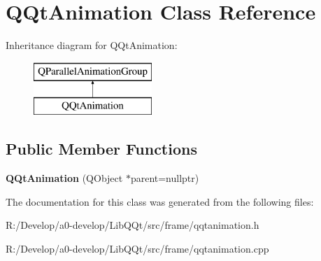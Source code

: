 \hypertarget{class_q_qt_animation}{}\section{Q\+Qt\+Animation Class Reference}
\label{class_q_qt_animation}
Inheritance diagram for Q\+Qt\+Animation\+:\begin{figure}[H]
\begin{center}
\leavevmode
\includegraphics[height=2.000000cm]{class_q_qt_animation}
\end{center}
\end{figure}
\subsection*{Public Member Functions}
\begin{DoxyCompactItemize}
\item 
\mbox{\label{class_q_qt_animation_af3109b3891df23fd895a6c425a377811}} 
{\bfseries Q\+Qt\+Animation} (Q\+Object $\ast$parent=nullptr)
\end{DoxyCompactItemize}


The documentation for this class was generated from the following files\+:\begin{DoxyCompactItemize}
\item 
R\+:/\+Develop/a0-\/develop/\+Lib\+Q\+Qt/src/frame/qqtanimation.\+h\item 
R\+:/\+Develop/a0-\/develop/\+Lib\+Q\+Qt/src/frame/qqtanimation.\+cpp\end{DoxyCompactItemize}
